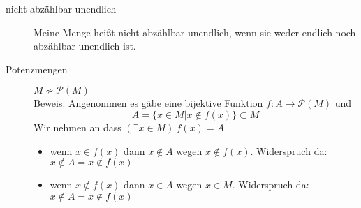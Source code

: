 \begin{description}
\begin{description}
        \item[nicht abzählbar unendlich] Meine Menge heißt nicht abzählbar unendlich, wenn sie weder endlich noch abzählbar unendlich ist.
        \item[Potenzmengen]$M \not \sim \mathcal{P}(M)$\\ Beweis:
        Angenommen es gäbe eine bijektive Funktion $f : A \longrightarrow \mathcal{P}(M)$ und
        \[A = \lbrace x \in M | x \not \in f(x) \rbrace \subset M\]
        Wir nehmen an dass $(\exists x \in M)\ f(x) = A$
        \begin{itemize}
            \item wenn $x \in f(x) $ dann $x \not \in A$ wegen $x \not \in f(x)$. Widerspruch da: $x \not \in A = x \not \in f(x)$
            \item wenn $x \not \in f(x)$ dann $x \in A$ wegen $x \in M$. Widerspruch da: $x \not \in A = x \not \in f(x)$
        \end{itemize}
    \end{description}
\end{description}
